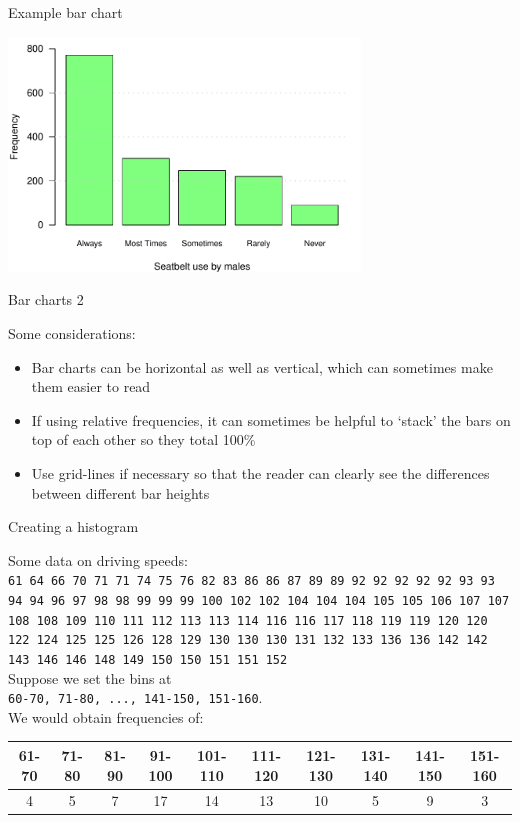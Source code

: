 \documentclass[12pt,xcolor=dvipsnames,handout,mathserif,aspectratio=169]{beamer}
\begin{document}
\begin{frame}{ Example bar chart }

\begin{center}
\includegraphics[width=0.7\textwidth]{SeatbeltBarChartCompare.pdf}
\end{center}

\end{frame}


\begin{frame}{ Bar charts 2 }

Some considerations:
\begin{itemize}
\item Bar charts can be horizontal as well as vertical, which can sometimes make them easier to read
\pause
\item If using relative frequencies, it can sometimes be helpful to `stack' the bars on top of each other so they total 100\%
\pause
\item Use grid-lines if necessary so that the reader can clearly see the differences between different bar heights
\end{itemize}

\end{frame}

\begin{frame}{ Creating a histogram }

Some data on driving speeds:\\
\texttt{61 64 66 70 71 71 74 75 76 82 83 86 86 87 89 89 92 92 92 92 92 93 93 94 94 96 97 98 98 99 99 99 100 102 102 104 104 104 105 105 106 107 107 108 108 109 110 111 112 113 113 114 116 
116 117 118 119 119 120 120 122 124 125 125 126 128 129 130 130 130 131 132 133 136 136 142 142 143 146 146 148 149 150 150 151 151 152}\\
\pause
Suppose we set the bins at\\ \texttt{60-70, 71-80, ..., 141-150, 151-160}.\\
\vspace{0.2cm}
We would obtain frequencies of:
\tiny
\begin{center}
\begin{tabular}{cccccccccc}
\hline
61-70 & 71-80 & 81-90 & 91-100 & 101-110 & 111-120 & 121-130 & 131-140 & 141-150 & 151-160\\
\hline
4 & 5 & 7 & 17 & 14 & 13 & 10 &  5 &  9 &  3 \\
\hline
\end{tabular}
\end{center}

\end{frame}
\end{document}
